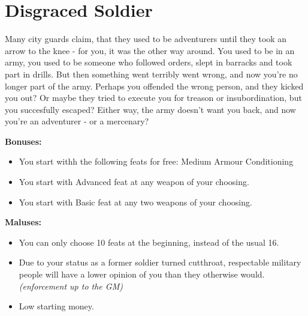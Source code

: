 \section{Disgraced Soldier}
Many city guards claim, that they used to be adventurers until they took an arrow to the knee - for you, it was the other way around. You used to be in an army, you used to be someone who followed orders, slept in barracks and took part in drills. But then something went terribly went wrong, and now you're no longer part of the army. Perhaps you offended the wrong person, and they kicked you out? Or maybe they tried to execute you for treason or insubordination, but you succesfully escaped? Either way, the army doesn't want you back, and now you're an adventurer - or a mercenary? 


\textbf{Bonuses:}
\begin{itemize}
	\item You start withh the following feats for free: Medium Armour Conditioning
	\item You start with Advanced feat at any weapon of your choosing.
	\item You start with Basic feat at any two weapons of your choosing.
\end{itemize}
\textbf{Maluses:}
\begin{itemize}
	\item You can only choose 10 feats at the beginning, instead of the usual 16.
	\item Due to your status as a former soldier turned cutthroat, respectable military people will have a lower opinion of you than they otherwise would. \textit{(enforcement up to the GM)}
	\item Low starting money.
\end{itemize}
